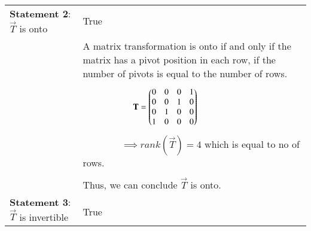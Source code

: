 \documentclass[journal,12pt]{IEEEtran}
\begin{document}
\begin{longtable}{|p{5cm}|p{13cm}|}
	\hline
	\multirow{3}{*}{\textbf{Statement 2}:$\vec{T}$ is onto}&\\
    & True\\
	\hline
	&\\
	& A matrix transformation is onto if and only if the matrix has a pivot position in each row, if the number of pivots is equal to the number of rows.\\
	&\\
	& $\qquad\qquad\qquad\mathbf{T}=\begin{pmatrix}0&0&0&1\\0&0&1&0\\0&1&0&0\\1&0&0&0\end{pmatrix}$\\
	&\\
	& $\qquad\qquad\implies rank(\vec{T})= 4$ which is equal to no of rows.\\
	&\\
	& Thus, we can conclude $\vec{T}$ is onto.\\
	
	\hline
	\multirow{3}{*}{\textbf{Statement 3}:$\vec{T}$ is invertible} &\\
    & True\\
	\hline
	

\end{longtable}
\end{document}
